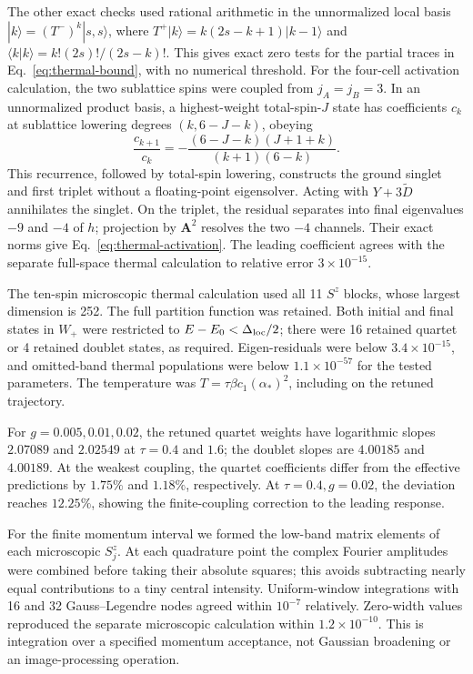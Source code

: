 The other exact checks used rational arithmetic in the unnormalized local basis
$|k\rangle=(T^-)^k|s,s\rangle$, where
$T^+|k\rangle=k(2s-k+1)|k-1\rangle$ and
$\langle k|k\rangle=k!(2s)!/(2s-k)!$.
This gives exact zero tests for the partial traces in
Eq.~\eqref{eq:thermal-bound}, with no numerical threshold.
For the four-cell activation calculation, the two sublattice spins were
coupled from $j_A=j_B=3$. In an unnormalized product basis, a highest-weight
total-spin-$J$ state has coefficients $c_k$ at sublattice lowering degrees
$(k,6-J-k)$, obeying
\begin{equation}
 \frac{c_{k+1}}{c_k}
 =-\frac{(6-J-k)(J+1+k)}{(k+1)(6-k)}.
\end{equation}
This recurrence, followed by total-spin lowering, constructs the ground
singlet and first triplet without a floating-point eigensolver.
Acting with $Y+3\widetilde D$ annihilates the singlet. On the triplet,
the residual separates into final eigenvalues $-9$ and $-4$ of $h$;
projection by $\bm A^2$ resolves the two $-4$ channels. Their exact norms
give Eq.~\eqref{eq:thermal-activation}. The leading coefficient agrees
with the separate full-space thermal calculation to relative error
$3\times10^{-15}$.

The ten-spin microscopic thermal calculation used all 11 $S^z$ blocks,
whose largest dimension is 252. The full partition function was retained.
Both initial and final states in $W_+$ were restricted to
$E-E_0<\Delta_{\mathrm{loc}}/2$; there were 16 retained quartet or 4 retained doublet
states, as required. Eigen-residuals were below $3.4\times10^{-15}$,
and omitted-band thermal populations were below $1.1\times10^{-57}$
for the tested parameters. The temperature was
$T=\tau\beta c_1(\alpha_*)^2$, including on the retuned trajectory.

For $g=0.005,0.01,0.02$, the retuned quartet weights have logarithmic
slopes $2.07089$ and $2.02549$ at $\tau=0.4$ and $1.6$;
the doublet slopes are $4.00185$ and $4.00189$.
At the weakest coupling, the quartet coefficients differ from the
effective predictions by $1.75\%$ and $1.18\%$, respectively.
At $\tau=0.4,g=0.02$, the deviation reaches $12.25\%$,
showing the finite-coupling correction to the leading response.

For the finite momentum interval we formed the low-band matrix elements
of each microscopic $S_j^z$. At each quadrature point the complex Fourier
amplitudes were combined before taking their absolute squares; this
avoids subtracting nearly equal contributions to a tiny central intensity.
Uniform-window integrations with 16 and 32 Gauss--Legendre nodes agreed
within $10^{-7}$ relatively. Zero-width values reproduced the separate
microscopic calculation within $1.2\times10^{-10}$. This is integration
over a specified momentum acceptance, not Gaussian broadening or an
image-processing operation.


